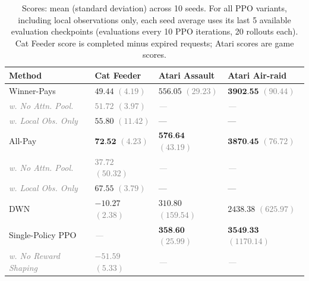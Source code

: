\begin{table}
  \caption{Scores: mean (standard deviation) across 10 seeds. For all PPO variants, including local observations only, each seed average uses its last 5 available evaluation checkpoints (evaluations every 10 PPO iterations, 20 rollouts each). Cat Feeder score is completed minus expired requests; Atari scores are game scores.}
  \label{tab:all_methods_comp}
  \centering
  \begin{tabular}{llll}
    \toprule
    {\bf Method} & {\bf Cat Feeder} & {\bf Atari Assault} & {\bf Atari Air-raid} \\
    \midrule
    Winner-Pays & $49.44$ {\small\textcolor{gray}{$(4.19)$}} & $556.05$ {\small\textcolor{gray}{$(29.23)$}} & $\textbf{3902.55}$ {\small\textcolor{gray}{$(90.44)$}} \\
    \textcolor{gray}{\itshape\hspace{1em}w. No Attn. Pool.} & \textcolor{gray}{\itshape $51.72$ {\small$(3.97)$}} & \textcolor{gray}{\itshape ---} & \textcolor{gray}{\itshape ---} \\
    \textcolor{gray}{\itshape\hspace{1em}w. Local Obs. Only} & $55.80$ {\small\textcolor{gray}{$(11.42)$}} & --- & --- \\
    All-Pay & $\textbf{72.52}$ {\small\textcolor{gray}{$(4.23)$}} & $\textbf{576.64}$ {\small\textcolor{gray}{$(43.19)$}} & $\textbf{3870.45}$ {\small\textcolor{gray}{$(76.72)$}} \\
    \textcolor{gray}{\itshape\hspace{1em}w. No Attn. Pool.} & \textcolor{gray}{\itshape $37.72$ {\small$(50.32)$}} & \textcolor{gray}{\itshape ---} & \textcolor{gray}{\itshape ---} \\
    \textcolor{gray}{\itshape\hspace{1em}w. Local Obs. Only} & $67.55$ {\small\textcolor{gray}{$(3.79)$}} & --- & --- \\
    \midrule
    DWN & $-10.27$ {\small\textcolor{gray}{$(2.38)$}} & $310.80$ {\small\textcolor{gray}{$(159.54)$}} & $2438.38$ {\small\textcolor{gray}{$(625.97)$}} \\
    Single-Policy PPO & \textcolor{gray}{\itshape ---} & $\textbf{358.60}$ {\small\textcolor{gray}{$(25.99)$}} & $\textbf{3549.33}$ {\small\textcolor{gray}{$(1170.14)$}} \\
    \textcolor{gray}{\itshape\hspace{1em}w. No Reward Shaping} & \textcolor{gray}{\itshape $-51.59$ {\small$(5.33)$}} & \textcolor{gray}{\itshape ---} & \textcolor{gray}{\itshape ---} \\

\end{tabular}
\end{table}
